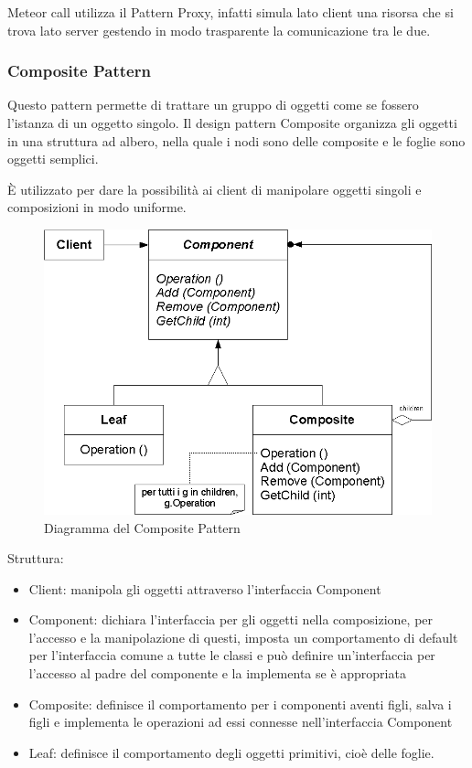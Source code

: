 Meteor call utilizza il Pattern Proxy, infatti simula lato client una risorsa che si trova lato server gestendo in modo trasparente la comunicazione tra le due.

\subsubsection{Composite Pattern}
Questo pattern permette di trattare un gruppo di oggetti come se fossero l'istanza di un oggetto singolo. Il design pattern Composite organizza gli oggetti in una struttura ad albero, nella quale i nodi sono delle composite e le foglie sono oggetti semplici.

È utilizzato per dare la possibilità ai client di manipolare oggetti singoli e composizioni in modo uniforme.

	\FloatBarrier
	\begin{figure}[ht]
		\centering
		\includegraphics[scale=0.45]{img/Composite_Pattern.png}
		\caption{Diagramma del Composite Pattern}
	\end{figure}


Struttura:
\begin{itemize}
	\item Client: manipola gli oggetti attraverso l'interfaccia Component
	\item Component: dichiara l'interfaccia per gli oggetti nella
     composizione, per l'accesso e la manipolazione di questi, imposta
     un comportamento di default per l'interfaccia comune a tutte le
     classi e può definire un'interfaccia per l'accesso al padre del
     componente e la implementa se è appropriata 
	\item Composite: definisce il comportamento per i componenti aventi figli, salva i figli e implementa le operazioni ad essi connesse nell'interfaccia Component
	\item Leaf: definisce il comportamento degli oggetti primitivi, cioè delle foglie.
\end{itemize}

